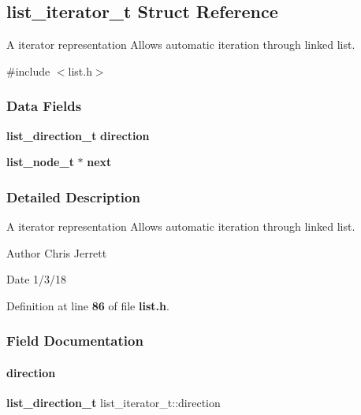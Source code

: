 \subsection{list\+\_\+iterator\+\_\+t Struct Reference}
\label{structlist__iterator__t}


A iterator representation Allows automatic iteration through linked list.  




{\ttfamily \#include $<$list.\+h$>$}

\subsubsection*{Data Fields}
\begin{DoxyCompactItemize}
\item 
\textbf{ list\+\_\+direction\+\_\+t} \textbf{ direction}
\item 
\textbf{ list\+\_\+node\+\_\+t} $\ast$ \textbf{ next}
\end{DoxyCompactItemize}


\subsubsection{Detailed Description}
A iterator representation Allows automatic iteration through linked list. 

\begin{DoxyAuthor}{Author}
Chris Jerrett 
\end{DoxyAuthor}
\begin{DoxyDate}{Date}
1/3/18 
\end{DoxyDate}


Definition at line \textbf{ 86} of file \textbf{ list.\+h}.



\subsubsection{Field Documentation}
\mbox{\label{structlist__iterator__t_aa95ac6753d9a9e3671e4c21f3d05b32a}} 
\paragraph{direction}
{\footnotesize\ttfamily \textbf{ list\+\_\+direction\+\_\+t} list\+\_\+iterator\+\_\+t\+::direction}



